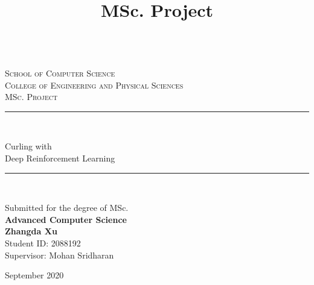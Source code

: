 \documentclass[oneside,11pt,a4paper]{article}
\title{MSc. Project\\\bhamthesistitle}
\author{\textsf{\bhamstudentname }}
\date{}
\newcommand{\bhamstudentname}{Zhangda Xu}
\newcommand{\bhamfronttitle}{Curling with \\ Deep Reinforcement Learning}
\newcommand{\bhamschool}{School of Computer Science}
\newcommand{\bhamcollege}{Engineering and Physical Sciences}
\newcommand{\bhamdegree}{Advanced Computer Science}
\newcommand{\bhamid}{2088192}
\newcommand{\bhamsupervisor}{Mohan Sridharan}
\newcommand{\bhamyear}{2020}
\newcommand{\HRule}{\rule{\linewidth}{0.5mm}}
\begin{document}
\begin{titlepage}
\begin{center}
\begin{minipage}{6in}
  \centering
  \hspace*{.2in}
  \end{minipage}
  \\ [1.0cm]
\textsc{{\LARGE \bhamschool\\}College of \bhamcollege}\\[3.5cm]

\textsc{\Large MSc. Project}\\[0.5cm]

\HRule \\[0.4cm]
\begin{center}\Huge
\bhamfronttitle
\end{center}
\HRule \\[1.5cm]

\begin{center}
Submitted for the degree of MSc. \\ \textbf{{\large \bhamdegree}}\\
\vspace{1.5cm}
{\Large \textbf{\bhamstudentname}}\\
Student ID: \bhamid\\
\vspace{1.5cm}
{\Large Supervisor: \bhamsupervisor}
\end{center}
\vfill

{\large September \bhamyear}

\end{center}
\end{titlepage}
\end{document}
